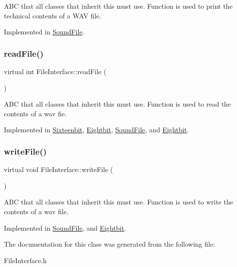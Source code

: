 A\+BC that all classes that inherit this must use. Function is used to print the technical contents of a W\+AV file. 

Implemented in \hyperlink{classSoundFile_a44b17fb295a9918410c7ec4242370ef9}{Sound\+File}.

\mbox{\label{classFileInterface_ad6a8364f2255b7d724622eb8828b2c1c}} 
\subsubsection{\texorpdfstring{read\+File()}{readFile()}}
{\footnotesize\ttfamily virtual int File\+Interface\+::read\+File (\begin{DoxyParamCaption}{ }\end{DoxyParamCaption})\hspace{0.3cm}{\ttfamily [pure virtual]}}

A\+BC that all classes that inherit this must use. Function is used to read the contents of a wav fie. 

Implemented in \hyperlink{classSixteenbit_ab34f06b23dabdf172f1c0990c5648ff1}{Sixteenbit}, \hyperlink{classEightbit_a52c70b7685cfca5f810d441a20ec5745}{Eightbit}, \hyperlink{classSoundFile_a35eb7dfeadb241c8ab4477ff1370dd5b}{Sound\+File}, and \hyperlink{classEightbit_a52c70b7685cfca5f810d441a20ec5745}{Eightbit}.

\mbox{\label{classFileInterface_a46344a063894f43e2594f4dca786756a}} 
\subsubsection{\texorpdfstring{write\+File()}{writeFile()}}
{\footnotesize\ttfamily virtual void File\+Interface\+::write\+File (\begin{DoxyParamCaption}{ }\end{DoxyParamCaption})\hspace{0.3cm}{\ttfamily [pure virtual]}}

A\+BC that all classes that inherit this must use. Function is used to write the contents of a wav file. 

Implemented in \hyperlink{classSoundFile_aaaa496c20586d179906a301f0b4ab3a5}{Sound\+File}, and \hyperlink{classEightbit_a7d5ab91f909b7c7f3fc48fdffbc3c57c}{Eightbit}.



The documentation for this class was generated from the following file\+:\begin{DoxyCompactItemize}
\item 
File\+Interface.\+h\end{DoxyCompactItemize}
